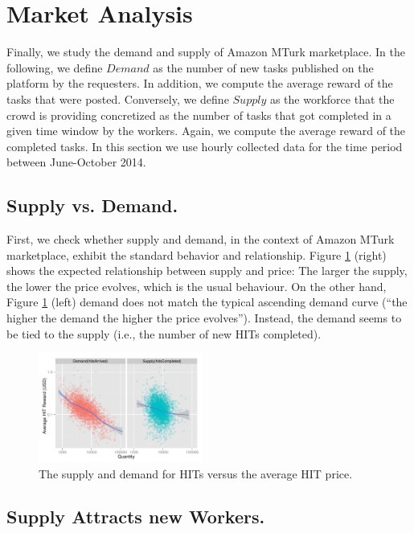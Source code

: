 \section{Market Analysis}
\label{sec:market}
Finally, we study the demand and supply of Amazon MTurk marketplace. In the following, we define $Demand$ as the number of new tasks published on the platform by the requesters. In addition, we compute the average reward of the tasks that were posted. Conversely, we define $Supply$ as the workforce that the crowd is providing concretized as the number of tasks that got completed in a given time window by the workers. Again, we compute the average reward of the completed tasks.
In this section we use hourly collected data for the time period between June-October 2014.

\subsection{Supply vs. Demand.}
First, we check whether supply and demand, in the context of Amazon MTurk marketplace, exhibit the standard behavior and relationship.
Figure \ref{fig:dsup} (right) shows the expected relationship between supply and price: The larger the supply, the lower the price evolves, which is the usual behaviour. On the other hand, Figure \ref{fig:dsup} (left) demand does not match the typical ascending demand curve (``the higher the demand the higher the price evolves''). Instead, the demand seems to be tied to the supply (i.e., the number of new HITs completed).

\begin{figure}[tb]
	\centering
		\includegraphics[width=0.48\textwidth]{figures/ds}
	\caption{The supply and demand for HITs versus the average HIT price.}
	\label{fig:dsup}
\end{figure}

\subsection{Supply Attracts new Workers.} %

